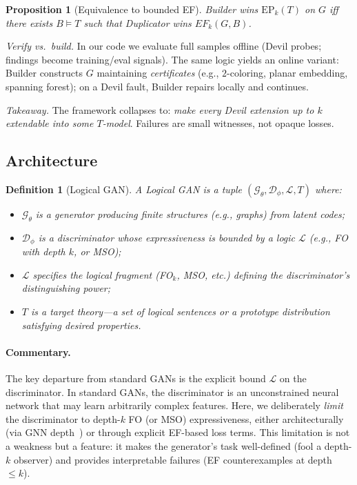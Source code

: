 \documentclass{article}
\newtheorem{proposition}[theorem]{Proposition}
\newtheorem{definition}[theorem]{Definition}
\begin{document}
\begin{proposition}[Equivalence to bounded EF]
\label{prop:ep_ef_equiv}
Builder wins $\mathrm{EP}_k(T)$ on $G$ iff there exists $B\models T$ such that Duplicator wins $EF_k(G,B)$.
\end{proposition}

\textit{Verify vs.\ build.}
In our code we evaluate full samples offline (Devil probes; findings become training/eval signals). The same logic yields an online variant: Builder constructs $G$ maintaining \emph{certificates} (e.g., $2$-coloring, planar embedding, spanning forest); on a Devil fault, Builder repairs locally and continues.

\textit{Takeaway.}
The framework collapses to: \emph{make every Devil extension up to $k$ extendable into some $T$-model}. Failures are small witnesses, not opaque losses.

\subsection{Architecture}
\begin{definition}[Logical GAN]
\label{def:logical_gan}
A Logical GAN is a tuple $(\mathcal{G}_\theta, \mathcal{D}_\phi, \mathcal{L}, T)$ where:
\begin{itemize}[noitemsep]
    \item $\mathcal{G}_\theta$ is a generator producing finite structures (e.g., graphs) from latent codes;
    \item $\mathcal{D}_\phi$ is a discriminator whose expressiveness is bounded by a logic $\mathcal{L}$ (e.g., FO with depth $k$, or MSO);
    \item $\mathcal{L}$ specifies the logical fragment (FO$_k$, MSO, etc.) defining the discriminator's distinguishing power;
    \item $T$ is a target theory---a set of logical sentences or a prototype distribution satisfying desired properties.
\end{itemize}
\end{definition}

\paragraph{Commentary.}
The key departure from standard GANs is the explicit bound $\mathcal{L}$ on the discriminator. In standard GANs, the discriminator is an unconstrained neural network that may learn arbitrarily complex features. Here, we deliberately \emph{limit} the discriminator to depth-$k$ FO (or MSO) expressiveness, either architecturally (via GNN depth~\cite{xu2018powerful,morris2019weisfeiler}) or through explicit EF-based loss terms. This limitation is not a weakness but a feature: it makes the generator's task well-defined (fool a depth-$k$ observer) and provides interpretable failures (EF counterexamples at depth $\le k$).
\end{document}
